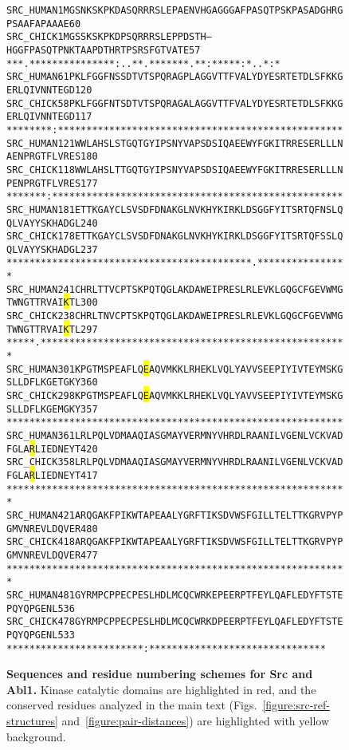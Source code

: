 \documentclass[aps,prl,preprint,nofootinbib,superscriptaddress,linenumbers]{revtex4-1}
\begin{document}
\begin{figure}[tb]
\begin{alltt}
SRC_HUMAN   1     MGSNKSKPKD ASQRRRSLEP AENVHGAGGG AFPASQTPSK PASADGHRGP SAAFAPAAAE    60
SRC_CHICK   1     MGSSKSKPKD PSQRRRSLEP PDSTH---HG GFPASQTPNK TAAPDTHRTP SRSFGTVATE    57
                  ***.******  *********  :..*    * .*******.*  *: * ** * * :*. .*:*  
SRC_HUMAN   61    PKLFGGFNSS DTVTSPQRAG PLAGGVTTFV ALYDYESRTE TDLSFKKGER LQIVNNTEGD   120
SRC_CHICK   58    PKLFGGFNTS DTVTSPQRAG ALAGGVTTFV ALYDYESRTE TDLSFKKGER LQIVNNTEGD   117
                  ********:* **********  ********* ********** ********** **********  
SRC_HUMAN   121   WWLAHSLSTG QTGYIPSNYV APSDSIQAEE WYFGKITRRE SERLLLNAEN PRGTFLVRES   180
SRC_CHICK   118   WWLAHSLTTG QTGYIPSNYV APSDSIQAEE WYFGKITRRE SERLLLNPEN PRGTFLVRES   177
                  *******:** ********** ********** ********** ******* ** **********  
SRC_HUMAN   181   ETTKGAYCLS VSDFDNAKGL NVKHYKIRKL DSGGFYITSR TQFNSLQQLV AYYSKHADGL   240
SRC_CHICK   178   ETTKGAYCLS VSDFDNAKGL NVKHYKIRKL DSGGFYITSR TQFSSLQQLV AYYSKHADGL   237
                  ********** ********** ********** ********** ***.****** **********  
SRC_HUMAN   241   CHRLTTVCPT SKPQTQGLAK DAWEIPRES{\color{red}L RLEVKLGQGC FGEVWMGTWN GTTRVAI{\setlength{\fboxsep}{0pt}\colorbox{yellow}{K}}TL}   300
SRC_CHICK   238   CHRLTNVCPT SKPQTQGLAK DAWEIPRES{\color{red}L RLEVKLGQGC FGEVWMGTWN GTTRVAI{\setlength{\fboxsep}{0pt}\colorbox{yellow}{K}}TL}   297
                  *****.**** ********** ********** ********** ********** **********  
SRC_HUMAN   301   {\color{red}KPGTMSPEAF LQ{\setlength{\fboxsep}{0pt}\colorbox{yellow}{E}}AQVMKKL RHEKLVQLYA VVSEEPIYIV TEYMSKGSLL DFLKGETGKY}   360
SRC_CHICK   298   {\color{red}KPGTMSPEAF LQ{\setlength{\fboxsep}{0pt}\colorbox{yellow}{E}}AQVMKKL RHEKLVQLYA VVSEEPIYIV TEYMSKGSLL DFLKGEMGKY}   357
                  ********** ********** ********** ********** ********** ****** ***  
SRC_HUMAN   361   {\color{red}LRLPQLVDMA AQIASGMAYV ERMNYVHRDL RAANILVGEN LVCKVADFGL A{\setlength{\fboxsep}{0pt}\colorbox{yellow}{R}}LIEDNEYT}   420
SRC_CHICK   358   {\color{red}LRLPQLVDMA AQIASGMAYV ERMNYVHRDL RAANILVGEN LVCKVADFGL A{\setlength{\fboxsep}{0pt}\colorbox{yellow}{R}}LIEDNEYT}   417
                  ********** ********** ********** ********** ********** **********  
SRC_HUMAN   421   {\color{red}ARQGAKFPIK WTAPEAALYG RFTIKSDVWS FGILLTELTT KGRVPYPGMV NREVLDQVER}   480
SRC_CHICK   418   {\color{red}ARQGAKFPIK WTAPEAALYG RFTIKSDVWS FGILLTELTT KGRVPYPGMV NREVLDQVER}   477
                  ********** ********** ********** ********** ********** **********  
SRC_HUMAN   481   {\color{red}GYRMPCPPEC PESLHDLMCQ CWRKEPEERP TFEYLQAFLE DYF}TSTEPQY QPGENL       536
SRC_CHICK   478   {\color{red}GYRMPCPPEC PESLHDLMCQ CWRKDPEERP TFEYLQAFLE DYF}TSTEPQY QPGENL       533
                  ********** ********** ****:***** ********** ********** ******
\end{alltt}

    \caption{{\bf Sequences and residue numbering schemes for Src and Abl1.}
Kinase catalytic domains are highlighted in red, and the conserved residues analyzed in the main text (Figs.~\ref{figure:src-ref-structures} and~\ref{figure:pair-distances}) are highlighted with yellow background.
  }
  \label{figure:residue-numbering-schemes}
\end{figure}
\end{document}
